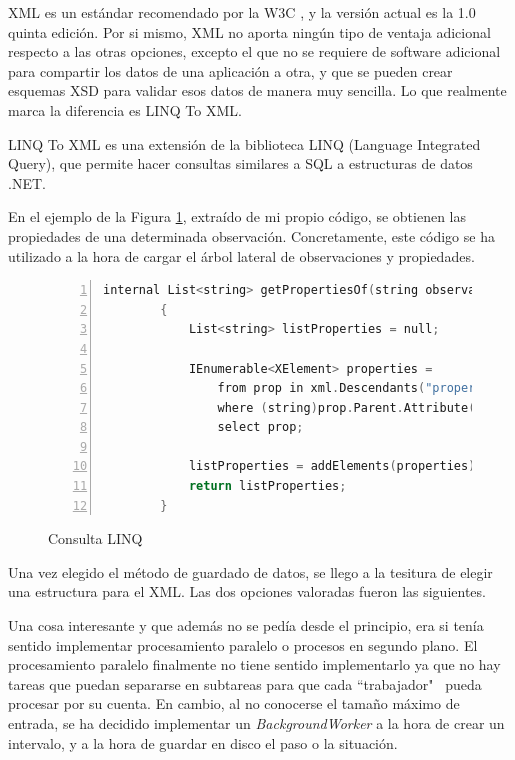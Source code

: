 XML es un est\'andar recomendado por la W3C \cite{XML:Specification}, y la versi\'on actual es la 1.0 quinta edici\'on.
Por si mismo, XML no aporta ning\'un tipo de ventaja adicional respecto a las otras opciones, excepto el que no se
requiere de software adicional para compartir los datos de una aplicaci\'on a otra, y que
se pueden crear esquemas XSD para validar esos datos de manera muy sencilla. 
Lo que realmente marca
la diferencia es LINQ To XML.

LINQ To XML es una extensi\'on de la biblioteca LINQ (Language Integrated Query), que permite hacer consultas
similares a SQL a estructuras de datos .NET. 

En el ejemplo de la Figura \ref{Consulta LINQ}, extra\'ido de mi propio c\'odigo, se obtienen las propiedades de
una determinada observaci\'on.
Concretamente, este c\'odigo se ha utilizado a la hora de cargar el \'arbol lateral
de observaciones y propiedades.

\begin{figure}[h]
	\begin{lstlisting}[tabsize=2, language=C, numbers=left, showspaces=false, breaklines=true]
		internal List<string> getPropertiesOf(string observation)
        {
            List<string> listProperties = null;
            
            IEnumerable<XElement> properties =
                from prop in xml.Descendants("property")
                where (string)prop.Parent.Attribute("name") == observation
                select prop;
            
            listProperties = addElements(properties);
            return listProperties;
        }
	\end{lstlisting}
	\caption[Consulta LINQ]{Consulta LINQ}
	\label{Consulta LINQ}
\end{figure}

Una vez elegido el m\'etodo de guardado de datos, se llego a la tesitura de elegir una estructura para el XML.
Las dos opciones valoradas fueron las siguientes.

Una cosa interesante y que adem\'as no se ped\'ia desde el principio, era si 
ten\'ia sentido implementar procesamiento paralelo o procesos en segundo plano. El 
procesamiento paralelo finalmente no tiene sentido implementarlo ya que no hay tareas
que puedan separarse en subtareas para que cada ``trabajador" \ pueda procesar por su
cuenta. En cambio, al no conocerse el tama\~no m\'aximo de entrada, se ha decidido
implementar un \emph{BackgroundWorker} a la hora de crear un intervalo, y a la hora
de guardar en disco el paso o la situaci\'on.

